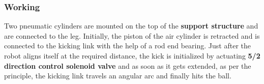 

        \subsubsection{Working}
            Two pneumatic cylinders are mounted on the top of the \textbf{support structure} and are connected to the leg. Initially, the 
            piston of the air cylinder is retracted and is connected to the kicking link with the help of a rod end bearing. Just after the robot
            aligns itself at the required distance, the kick is initialized by actuating \textbf{5/2 direction control solenoid valve} and as soon
            as it gets extended, as per the principle, the kicking link travels an angular arc and finally hits the ball.

            \vspace{0.1cm}

